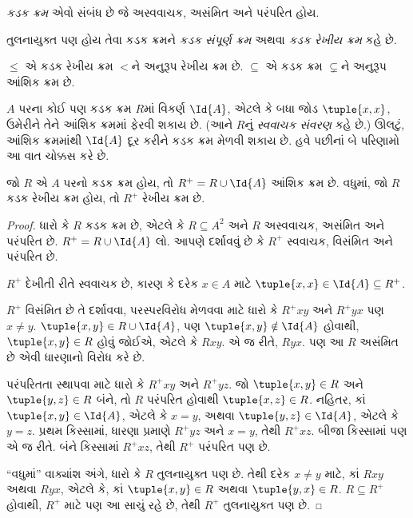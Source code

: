 \begin{defn}[કડક ક્રમ]
\emph{કડક ક્રમ} એવો સંબંધ છે જે અસ્વવાચક, અસંમિત અને પરંપરિત હોય.
\end{defn}

\begin{defn}[કડક રેખીય ક્રમ]
તુલનાયુક્ત પણ હોય તેવા કડક ક્રમને \emph{કડક સંપૂર્ણ ક્રમ}
અથવા \emph{કડક રેખીય ક્રમ} કહે છે.
\end{defn}

\begin{ex}
$\le$ એ કડક રેખીય ક્રમ $<$ને અનુરૂપ રેખીય ક્રમ છે.
$\subseteq$ એ કડક ક્રમ $\subsetneq$ને અનુરૂપ આંશિક ક્રમ છે.
\end{ex}

$A$ પરના કોઈ પણ કડક ક્રમ $R$માં વિકર્ણ $\Id{A}$,
એટલે કે બધા જોડ $\tuple{x, x}$, ઉમેરીને તેને આંશિક ક્રમમાં
ફેરવી શકાય છે. (આને $R$નું \emph{સ્વવાચક સંવરણ} કહે છે.)
ઊલટું, આંશિક ક્રમમાંથી $\Id{A}$ દૂર કરીને કડક ક્રમ મેળવી શકાય છે.
હવે પછીનાં બે પરિણામો આ વાત ચોક્કસ કરે છે.

\begin{prop}
જો $R$ એ $A$ પરનો કડક ક્રમ હોય, તો $R^+ = R \cup \Id{A}$
આંશિક ક્રમ છે. વધુમાં, જો $R$ કડક રેખીય ક્રમ હોય, તો
$R^+$ રેખીય ક્રમ છે.
\end{prop}

\begin{proof}
ધારો કે $R$ કડક ક્રમ છે, એટલે કે $R \subseteq A^2$ અને
$R$ અસ્વવાચક, અસંમિત અને પરંપરિત છે.
$R^+ = R \cup \Id{A}$ લો. આપણે દર્શાવવું છે કે
$R^+$ સ્વવાચક, વિસંમિત અને પરંપરિત છે.

$R^+$ દેખીતી રીતે સ્વવાચક છે, કારણ કે દરેક $x \in A$
માટે $\tuple{x, x} \in \Id{A} \subseteq R^+$.

$R^+$ વિસંમિત છે તે દર્શાવવા, પરસ્પરવિરોધ મેળવવા માટે ધારો કે
$R^+xy$ અને $R^+yx$ પણ $x \neq y$.
$\tuple{x,y} \in R \cup \Id{A}$, પણ
$\tuple{x, y} \notin \Id{A}$ હોવાથી,
$\tuple{x, y} \in R$ હોવું જોઈએ, એટલે કે $Rxy$.
એ જ રીતે, $Ryx$. પણ આ $R$ અસંમિત છે એવી ધારણાનો વિરોધ કરે છે.

પરંપરિતતા સ્થાપવા માટે ધારો કે $R^+xy$ અને $R^+yz$.
જો $\tuple{x, y} \in R$ અને $\tuple{y,z} \in R$ બંને,
તો $R$ પરંપરિત હોવાથી $\tuple{x, z} \in R$.
નહિતર, કાં $\tuple{x, y} \in \Id{A}$, એટલે કે $x = y$,
અથવા $\tuple{y, z} \in \Id{A}$, એટલે કે $y = z$.
પ્રથમ કિસ્સામાં, ધારણા પ્રમાણે $R^+yz$ અને $x = y$,
તેથી $R^+xz$. બીજા કિસ્સામાં પણ એ જ રીતે.
બંને કિસ્સામાં $R^+xz$, તેથી $R^+$ પરંપરિત પણ છે.

“વધુમાં” વાક્યાંશ અંગે, ધારો કે $R$ તુલનાયુક્ત પણ છે.
તેથી દરેક $x \neq y$ માટે, કાં $Rxy$ અથવા $Ryx$,
એટલે કે, કાં $\tuple{x, y} \in R$ અથવા $\tuple{y, x} \in R$.
$R \subseteq R^+$ હોવાથી, $R^+$ માટે પણ આ સાચું રહે છે,
તેથી $R^+$ તુલનાયુક્ત પણ છે.
\end{proof}


